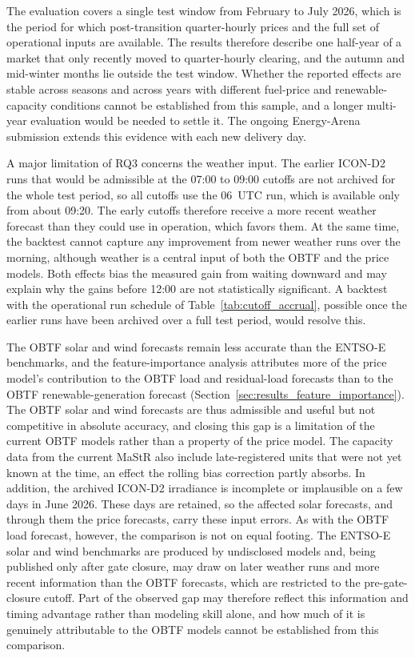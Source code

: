 The evaluation covers a single test window from February to July 2026, which is
the period for which post-transition quarter-hourly prices and the full set of
operational inputs are available. The results therefore describe one half-year of
a market that only recently moved to quarter-hourly clearing, and the autumn and
mid-winter months lie outside the test window. Whether the reported effects are
stable across seasons and across years with different fuel-price and
renewable-capacity conditions cannot be established from this sample, and a longer
multi-year evaluation would be needed to settle it. The ongoing Energy-Arena submission
extends this evidence with each new delivery day.

A major limitation of RQ3 concerns the weather input. The earlier
\mbox{ICON-D2} runs that would be admissible at the 07:00 to 09:00 cutoffs are
not archived for the whole test period, so all cutoffs use the 06~UTC run,
which is available only from about 09:20. The early cutoffs therefore receive a
more recent weather forecast than they could use in operation, which favors
them. At the same time, the backtest cannot capture any improvement from newer
weather runs over the morning, although weather is a central input of both the
OBTF and the price models. Both effects bias the measured gain from waiting
downward and may explain why the gains before 12:00 are not statistically
significant. A backtest with the operational run schedule of
Table~\ref{tab:cutoff_accrual}, possible once the earlier runs have been archived
over a full test period, would resolve this.

The OBTF solar and wind forecasts remain less accurate than the
\mbox{ENTSO-E} benchmarks, and the feature-importance analysis attributes more of
the price model's contribution to the OBTF load and residual-load forecasts than to the OBTF renewable-generation forecast (Section~\ref{sec:results_feature_importance}). The
OBTF solar and wind forecasts are thus admissible and useful but not competitive
in absolute accuracy, and closing this gap is a limitation of the current OBTF models rather than a property of the price model. The capacity data from the
current MaStR also include late-registered units that were not
yet known at the time, an effect the rolling bias correction partly absorbs. In
addition, the archived \mbox{ICON-D2} irradiance is incomplete or implausible on a
few days in June 2026. These days are retained, so the affected solar forecasts,
and through them the price forecasts, carry these input errors. As with the OBTF load forecast, however, the comparison is not on equal footing. The \mbox{ENTSO-E}
solar and wind benchmarks are produced by undisclosed models and, being published
only after gate closure, may draw on later weather runs and more recent
information than the OBTF forecasts, which are restricted to the
pre-gate-closure cutoff. Part of the observed gap may therefore reflect this
information and timing advantage rather than modeling skill alone, and how much of
it is genuinely attributable to the OBTF models cannot be established from
this comparison.

